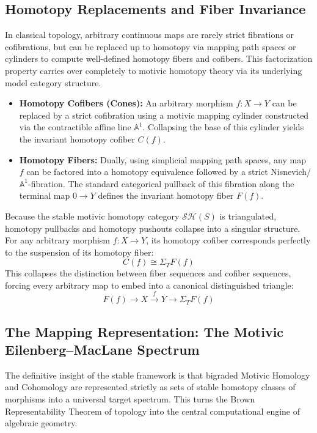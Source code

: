 \documentclass[11pt,oneside]{article}
\begin{document}
\subsection{Homotopy Replacements and Fiber Invariance}
In classical topology, arbitrary continuous maps are rarely strict fibrations or cofibrations, but can be replaced up to homotopy via mapping path spaces or cylinders to compute well-defined homotopy fibers and cofibers. This factorization property carries over completely to motivic homotopy theory via its underlying model category structure.
\begin{itemize}
    \item \textbf{Homotopy Cofibers (Cones):} An arbitrary morphism $f: X \to Y$ can be replaced by a strict cofibration using a motivic mapping cylinder constructed via the contractible affine line $\mathbb{A}^1$. Collapsing the base of this cylinder yields the invariant homotopy cofiber $C(f)$.
    \item \textbf{Homotopy Fibers:} Dually, using simplicial mapping path spaces, any map $f$ can be factored into a homotopy equivalence followed by a strict Nisnevich/$\mathbb{A}^1$-fibration. The standard categorical pullback of this fibration along the terminal map $0 \to Y$ defines the invariant homotopy fiber $F(f)$.
\end{itemize}
Because the stable motivic homotopy category $\mathcal{S}\mathcal{H}(S)$ is triangulated, homotopy pullbacks and homotopy pushouts collapse into a singular structure. For any arbitrary morphism $f: X \to Y$, its homotopy cofiber corresponds perfectly to the suspension of its homotopy fiber:
\[ C(f) \cong \Sigma_T F(f) \]
This collapses the distinction between fiber sequences and cofiber sequences, forcing every arbitrary map to embed into a canonical distinguished triangle:
\[ F(f) \longrightarrow X \xrightarrow{\ f\ } Y \longrightarrow \Sigma_T F(f) \]

\subsection{The Mapping Representation: The Motivic Eilenberg--MacLane Spectrum}
The definitive insight of the stable framework is that bigraded Motivic Homology and Cohomology are represented strictly as sets of stable homotopy classes of morphisms into a universal target spectrum. This turns the Brown Representability Theorem of topology into the central computational engine of algebraic geometry.
\end{document}

